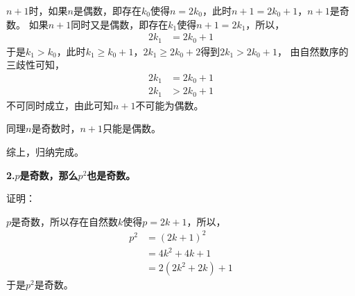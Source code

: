 \documentclass{article}
\theoremstyle{mystyle}
\begin{document}
$n+1$时，如果$n$是偶数，即存在$k_0$使得$n=2k_0$，此时$n+1=2k_0+1$，$n+1$是奇数。
如果$n+1$同时又是偶数，即存在$k_1$使得$n+1=2k_1$，所以，
\begin{align*}
  2k_1 & = 2k_0 + 1
\end{align*}
于是$k_1 > k_0$，此时$k_1 \geq k_0+1$，$2k_1 \geq 2k_0 + 2$得到$2k_1 > 2k_0 + 1$，
由自然数序的三歧性可知，
\begin{align}
  2k_1 & = 2k_0 + 1 \\
  2k_1 & > 2k_0 + 1
\end{align}
不可同时成立，由此可知$n+1$不可能为偶数。

同理$n$是奇数时，$n+1$只能是偶数。

综上，归纳完成。

\textbf{2.$p$是奇数，那么$p^2$也是奇数。}

证明：

$p$是奇数，所以存在自然数$k$使得$p=2k+1$，所以，
\begin{align*}
  p^2 & = (2k+1)^2         \\
      & = 4k^2 + 4k + 1    \\
      & = 2(2k^2 + 2k) + 1
\end{align*}
于是$p^2$是奇数。
\end{document}

